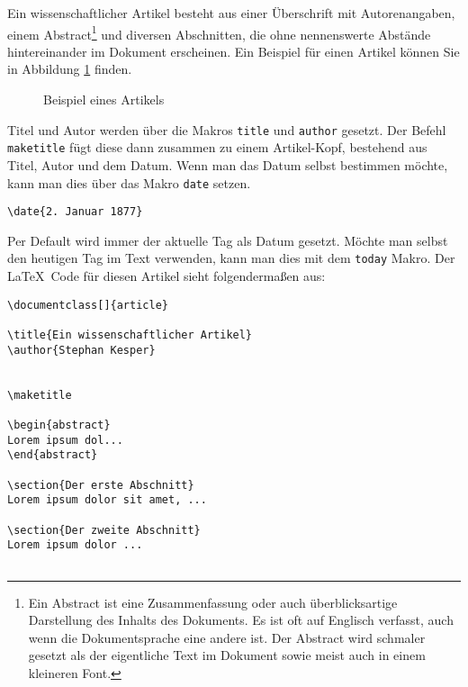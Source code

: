Ein wissenschaftlicher Artikel besteht aus einer Überschrift mit Autorenangaben, einem Abstract\footnote{Ein Abstract ist eine Zusammenfassung oder auch überblicksartige Darstellung des Inhalts des Dokuments. Es ist oft auf Englisch verfasst, auch wenn die Dokumentsprache eine andere ist. Der Abstract wird schmaler gesetzt als der eigentliche Text im Dokument sowie meist auch in einem kleineren Font.} und diversen Abschnitten, die ohne nennenswerte Abstände hintereinander im Dokument erscheinen. Ein Beispiel für einen Artikel können Sie in Abbildung \ref{fig:article} finden. 

\begin{figure}[p]
\centering
{}
\caption{Beispiel eines Artikels}
\label{fig:article}
\end{figure}

Titel und Autor werden über die Makros \texttt{title} und \texttt{author} gesetzt. Der Befehl \texttt{maketitle} fügt diese dann zusammen zu einem Artikel-Kopf, bestehend aus Titel, Autor und dem Datum. Wenn man das Datum selbst bestimmen möchte, kann man dies über das Makro \texttt{date} setzen. 
\begin{verbatim}
\date{2. Januar 1877}
\end{verbatim}
Per Default wird immer der aktuelle Tag als Datum gesetzt. Möchte man selbst den heutigen Tag im Text verwenden, kann man dies mit dem \texttt{today} Makro. Der \LaTeX\ Code für diesen Artikel sieht folgendermaßen aus:
\footnotesize
\begin{verbatim}
\documentclass[]{article}

\title{Ein wissenschaftlicher Artikel}
\author{Stephan Kesper}


\maketitle

\begin{abstract}
Lorem ipsum dol...
\end{abstract}

\section{Der erste Abschnitt}
Lorem ipsum dolor sit amet, ...

\section{Der zweite Abschnitt}
Lorem ipsum dolor ...


\end{verbatim}
\normalsize

